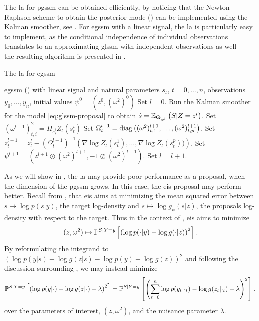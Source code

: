 The \acrshort{la} for \acrshort{pgssm} can be obtained efficiently, by noticing that the Newton-Raphson scheme to obtain the posterior mode () can be implemented using the Kalman smoother, see \citep[Chapter 10]{Durbin2012Time}. For \acrshort{egssm} with a linear signal, the \acrshort{la} is particularly easy to implement, as the conditional independence of individual observations translates to an approximating \acrshort{glssm} with independent observations as well ---  the resulting algorithm is presented in .

\begin{algorithm}
    \caption{The \gls{la} for \gls{egssm}}
    \label{alg:la}
    \begin{algorithmic}[1]
        \Require \acrshort{egssm} () with linear signal and natural parameters $s_{t}$, $t = 0, \dots, n$, observations $y_{0}, \dots, y_{n}$, initial values $\psi^{0} = \left( z^{0}, (\omega^{2})^{0} \right)$
        \State Set $l = 0$.
        \Repeat
            \State Run the Kalman smoother  for the model \eqref{eq:glssm-proposal} to obtain $\hat s = \mathbb E_{\mathbf G_{\psi^{l}}} \left( S | Z = z^{l} \right)$.
                \State Set $(\omega^{l + 1})^{2}_{t,i} = H_{s_{t}^{i}} Z_{t} (s_{t}^i)$ 
                \State Set $\Omega^{l + 1}_t = \operatorname{diag} \left( (\omega^{2})^{l + 1}_{t, 1}, \dots, (\omega^{2})^{l+1}_{t, p}\right)$. 
                \State Set $z_{t}^{l + 1} = z_{t}^{l} - (\Omega^{l + 1}_{t})^{-1} \left( \nabla \log Z_{t}(s_{t}^{1}), \dots, \nabla \log Z_{t}(s_{t}^p)) \right)$.  
            \EndFor
            \State Set $\psi^{l + 1} = \left( z^{l + 1} \oslash (\omega^{2})^{l + 1}, -1 \oslash (\omega^{2})^{l + 1}\right)$.
            \State Set $l = l +1$.
        
    \end{algorithmic}
\end{algorithm}

As we will show in , the \acrshort{la} may provide poor performance as a proposal, when the dimension of the \acrshort{pgssm} grows. In this case, the \acrshort{eis} proposal may perform better. Recall from , that \acrshort{eis} aims at minimizing the mean squared error between $s \mapsto \log p(s|y)$, the target log-density and $s\mapsto\log g_{\psi}(s|z)$, the proposals log-density with respect to the target. Thus in the context of , \acrshort{eis} aims to minimize
$$
(z, \omega^{2}) \mapsto {\ensuremath{\mathbb P^{S| Y=y}}}\left[\left( \log p(\cdot|y) - \log g(\cdot|z)\right)^{2}\right].
$$
By reformulating the integrand to $\left(\log p(y|s) - \log g(z|s) -  \log p(y)  + \log g(z)\right)^{2}$ and following the discussion surrounding , we may instead minimize
$$
    {\mathbb P^{S| Y=y}} \left[\left( \log p(y|\cdot) - \log g(z|\cdot) - \lambda \right)^{2}\right] = {\mathbb P^{S| Y=y}} \left[ \left(\sum_{t = 0}^n \log p(y_{t}|\cdot_{t}) - \log g(z_{t}|\cdot_{t})  - \lambda \right)^{2} \right].
$$
over the parameters of interest, $(z, \omega^{2})$, and the nuisance parameter $\lambda$.

